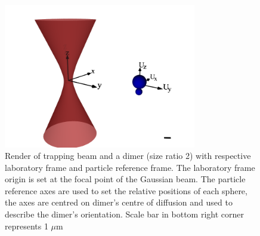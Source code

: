 \documentclass[preprint,  3p]{elsarticle}
\begin{document}
\begin{figure}[h]
	\centering
	\includegraphics[width=0.75\textwidth]{./Images/Lab_frame.png}
	\caption{\label{fig:lab_frame}
		Render of trapping beam and a dimer (size ratio 2) with respective laboratory frame and particle reference frame. The laboratory frame origin is set at the focal point of the Gaussian beam. The particle reference axes are used to set the relative positions of each sphere, the axes are centred on dimer's centre of diffusion and used to describe the dimer’s orientation. Scale bar in bottom right corner represents 1 $\mu$m
	}
\end{figure}
\end{document}
